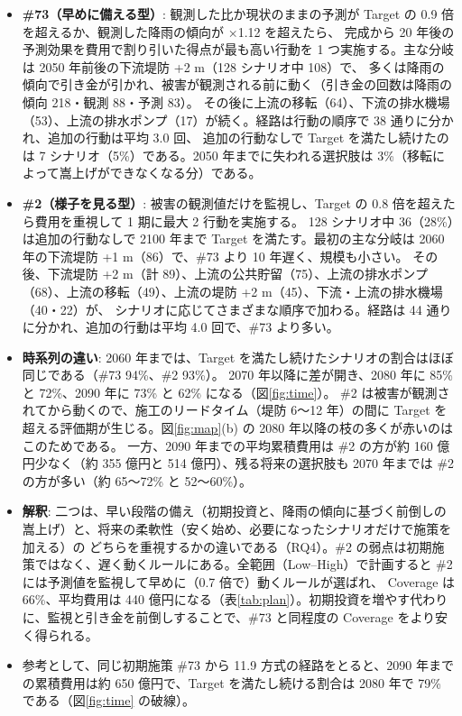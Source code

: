 \documentclass[a4paper,10pt]{ltjsarticle}
\begin{document}
\begin{itemize}
  \item \textbf{\#73（早めに備える型）}: 観測した比か現状のままの予測が Target の 0.9 倍を超えるか、観測した降雨の傾向が ×1.12 を超えたら、
    完成から 20 年後の予測効果を費用で割り引いた得点が最も高い行動を 1 つ実施する。主な分岐は 2050 年前後の下流堤防 +2 m（128 シナリオ中 108）で、
    多くは降雨の傾向で引き金が引かれ、被害が観測される前に動く（引き金の回数は降雨の傾向 218・観測 88・予測 83）。
    その後に上流の移転（64）、下流の排水機場（53）、上流の排水ポンプ（17）が続く。経路は行動の順序で 38 通りに分かれ、追加の行動は平均 3.0 回、
    追加の行動なしで Target を満たし続けたのは 7 シナリオ（5\%）である。2050 年までに失われる選択肢は 3\%（移転によって嵩上げができなくなる分）である。
  \item \textbf{\#2（様子を見る型）}: 被害の観測値だけを監視し、Target の 0.8 倍を超えたら費用を重視して 1 期に最大 2 行動を実施する。
    128 シナリオ中 36（28\%）は追加の行動なしで 2100 年まで Target を満たす。最初の主な分岐は 2060 年の下流堤防 +1 m（86）で、\#73 より 10 年遅く、規模も小さい。
    その後、下流堤防 +2 m（計 89）、上流の公共貯留（75）、上流の排水ポンプ（68）、上流の移転（49）、上流の堤防 +2 m（45）、下流・上流の排水機場（40・22）が、
    シナリオに応じてさまざまな順序で加わる。経路は 44 通りに分かれ、追加の行動は平均 4.0 回で、\#73 より多い。
  \item \textbf{時系列の違い}: 2060 年までは、Target を満たし続けたシナリオの割合はほぼ同じである（\#73 94\%、\#2 93\%）。
    2070 年以降に差が開き、2080 年に 85\% と 72\%、2090 年に 73\% と 62\% になる（図\ref{fig:time}）。
    \#2 は被害が観測されてから動くので、施工のリードタイム（堤防 6〜12 年）の間に Target を超える評価期が生じる。図\ref{fig:map}(b) の 2080 年以降の枝の多くが赤いのはこのためである。
    一方、2090 年までの平均累積費用は \#2 の方が約 160 億円少なく（約 355 億円と 514 億円）、残る将来の選択肢も 2070 年までは \#2 の方が多い（約 65〜72\% と 52〜60\%）。
  \item \textbf{解釈}: 二つは、早い段階の備え（初期投資と、降雨の傾向に基づく前倒しの嵩上げ）と、将来の柔軟性（安く始め、必要になったシナリオだけで施策を加える）の
    どちらを重視するかの違いである（RQ4）。\#2 の弱点は初期施策ではなく、遅く動くルールにある。全範囲（Low–High）で計画すると \#2 には予測値を監視して早めに（0.7 倍で）動くルールが選ばれ、
    Coverage は 66\%、平均費用は 440 億円になる（表\ref{tab:plan}）。初期投資を増やす代わりに、監視と引き金を前倒しすることで、\#73 と同程度の Coverage をより安く得られる。
  \item 参考として、同じ初期施策 \#73 から 11.9 方式の経路をとると、2090 年までの累積費用は約 650 億円で、Target を満たし続ける割合は 2080 年で 79\% である（図\ref{fig:time} の破線）。
\end{itemize}
\end{document}
